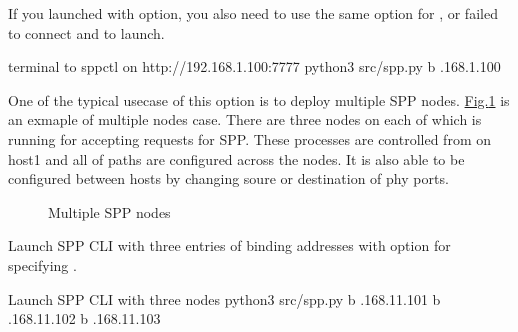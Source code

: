 \documentclass[a4paper,11pt,openany,oneside,english]{sphinxmanual}
\begin{document}
If you launched  with  option, you also need to use the same
option for , or failed to connect and to launch.

\begin{sphinxVerbatim}[commandchars=\\\{\},formatcom=\footnotesize]
 terminal 
  to spp\PYGZhy{}ctl on http://192.168.1.100:7777
 python3 src/spp.py \PYGZhy{}b .168.1.100

\end{sphinxVerbatim}

One of the typical usecase of this option is to deploy multiple SPP nodes.
\hyperref[\detokenize{gsg/howto_use:figure-spp-howto-multi-spp}]{Fig.\@ \ref{\detokenize{gsg/howto_use:figure-spp-howto-multi-spp}}} is an exmaple of multiple nodes case.
There are three nodes on each of which  is running for accepting
requests for SPP. These  processes are controlled from
 on host1 and all of paths are configured across the nodes.
It is also able to be configured between hosts by changing
soure or destination of phy ports.

\begin{figure}[htbp]
\centering
\capstart

\noindent{}
\caption{Multiple SPP nodes}\label{\detokenize{gsg/howto_use:id1}}\label{\detokenize{gsg/howto_use:figure-spp-howto-multi-spp}}\end{figure}

Launch SPP CLI with three entries of binding addresses with  option
for specifying .

\begin{sphinxVerbatim}[commandchars=\\\{\},formatcom=\footnotesize]
 Launch SPP CLI with three nodes
 python3 src/spp.py \PYGZhy{}b .168.11.101 
    \PYGZhy{}b .168.11.102 
    \PYGZhy{}b .168.11.103 
\end{sphinxVerbatim}
\end{document}
